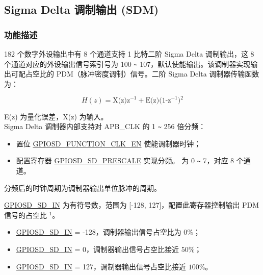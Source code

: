 \documentclass[main\_\_CN.tex]{subfiles}
\begin{document}
\subsection{Sigma Delta 调制输出 (SDM)}

\subsubsection{功能描述}
182 个数字外设输出中有 8 个通道支持 1 比特二阶 Sigma Delta 调制输出，这 8 个通道对应的外设输出信号索引号为 100 \verb+~+ 107，默认使能输出。该调制器实现输出可配占空比的 PDM（脉冲密度调制）信号。二阶 Sigma Delta 调制器传输函数为：

\[
    H(z)=\textrm{X(z)z$^{-1}$} + \textrm{E(z)(1-z$^{-1}$)$^{2}$}
    \]

E(z) 为量化误差，X(z) 为输入。\\
Sigma Delta 调制器内部支持对 APB\_CLK 的 1 \verb+~+ 256 倍分频：

\begin{itemize}
    \item 置位 \hyperref[fielddesc:GPIOSDFUNCTIONCLKEN]{GPIOSD\_FUNCTION\_CLK\_EN} 使能调制器时钟；
    \item 配置寄存器 \hyperref[fielddesc:GPIOSDSDNPRESCALE]{GPIOSD\_SD\_PRESCALE} 实现分频。 为 0 \verb+~+ 7，对应 8 个通道。
\end{itemize}
分频后的时钟周期为调制器输出单位脉冲的周期。

\hyperref[fielddesc:GPIOSDSDNIN]{GPIOSD\_SD\_IN} 为有符号数，范围为 [-128, 127]，配置此寄存器控制输出 PDM 信号的占空比 $^{1}$。

\begin{itemize}
    \item \hyperref[fielddesc:GPIOSDSDNIN]{GPIOSD\_SD\_IN} = -128，调制器输出信号占空比为 \begin{math}0\% \end{math}；
    \item \hyperref[fielddesc:GPIOSDSDNIN]{GPIOSD\_SD\_IN} = 0，调制器输出信号占空比接近  \begin{math}50\% \end{math}；
    \item \hyperref[fielddesc:GPIOSDSDNIN]{GPIOSD\_SD\_IN} = 127，调制器输出信号占空比接近  \begin{math}100\% \end{math}。
\end{itemize}
\end{document}
